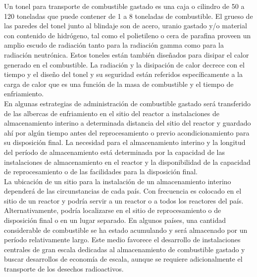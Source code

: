 \documentclass[]{article}
\begin{document}
Un tonel para transporte de combustible gastado es una caja o cilindro de 50 a 120 toneladas que puede contener de 1 a 8 toneladas de combustible. El grueso de las paredes del tonel junto al blindaje son de acero, uranio gastado y/o material con contenido de hidrógeno, tal como el polietileno o cera de parafina proveen un amplio escudo de radiación tanto para la radiación gamma como para la radiación neutrónica. Estos toneles están también diseñados para disipar el calor generado en el combustible. La radiación y la disipación de calor decrece con el tiempo y el diseño del tonel y su seguridad están referidos específicamente a la carga de calor que es una función de la masa de combustible y el tiempo de enfriamiento.\\

En algunas estrategias de administración de combustible gastado será transferido de las albercas de enfriamiento en el sitio del reactor a  instalaciones de almacenamiento interino a determinada distancia del sitio del reactor y guardado ahí por algún tiempo antes del reprocesamiento o previo acondicionamiento para su disposición final.  La necesidad para el almacenamiento interino y la longitud del período de almacenamiento está determinada por la capacidad de las instalaciones de almacenamiento en el reactor y la disponibilidad de la capacidad de reprocesamiento o de las facilidades para la disposición final. \\


La ubicación de un sitio para la instalación de un almacenamiento interino dependerá de las circunstancias de cada país. Con frecuencia es colocado en el sitio de un reactor y podría servir a un reactor o a todos los reactores del país. Alternativamente, podría localizarse en el sitio de reprocesamiento o de disposición final o en un lugar separado. En algunos países, una cantidad considerable de combustible se ha estado acumulando  y será almacenado por un período relativamente largo. Este medio favorece el desarrollo de instalaciones centrales de gran escala dedicadas al almacenamiento de combustible gastado y buscar desarrollos de economía de escala, aunque se requiere adicionalmente el transporte de los desechos radioactivos.\\
\end{document}
